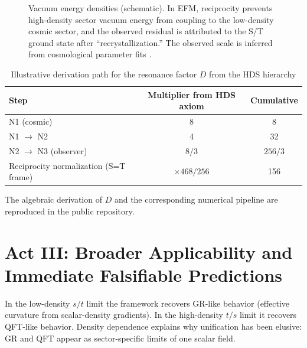 \documentclass[11pt, twoside]{article}
\begin{document}
\begin{figure}[H]
\centering
{}
\caption{Vacuum energy densities (schematic). In EFM, reciprocity prevents high-density sector vacuum energy from coupling to the low-density cosmic sector, and the observed residual is attributed to the S/T ground state after ``recrystallization.'' The observed scale is inferred from cosmological parameter fits \citep{planck2020}.}
\label{fig:vacuum}
\end{figure}

\begin{table}[H]
\centering
\caption{Illustrative derivation path for the resonance factor $D$ from the HDS hierarchy}
\begin{tabular}{lcc}
\toprule
Step & Multiplier from HDS axiom & Cumulative \\
\midrule
N1 (cosmic) & 8 & 8 \\
N1 $\to$ N2 & 4 & 32 \\
N2 $\to$ N3 (observer) & $8/3$ & $256/3$ \\
Reciprocity normalization (S=T frame) & $\times 468/256$ & 156 \\
\bottomrule
\end{tabular}
\label{tab:Dderivation}
\end{table}

The algebraic derivation of $D$ and the corresponding numerical pipeline are reproduced in the public repository.

\section{Act III: Broader Applicability and Immediate Falsifiable Predictions}
In the low-density $s/t$ limit the framework recovers GR-like behavior (effective curvature from scalar-density gradients). In the high-density $t/s$ limit it recovers QFT-like behavior. Density dependence explains why unification has been elusive: GR and QFT appear as sector-specific limits of one scalar field.
\end{document}
